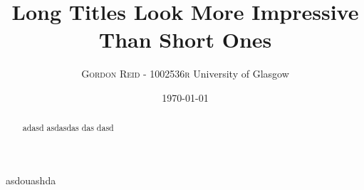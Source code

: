 \documentclass[twoside]{article}
\title{
	\fontsize{24pt}{10pt}\selectfont
	\textbf{Long Titles Look More Impressive Than Short Ones}
	}
\author{%
	\large
	\textsc{Gordon Reid - 1002536r}
	\normalsize	University of Glasgow \\
	\vspace{-5mm}
	}
\date{\today}
\begin{document}
\maketitle
\thispagestyle{fancy}

\begin{abstract}
\noindent adasd asdasdas das dasd
\end{abstract}


\begin{multicols}{2}

asdouashda

\nocite{*}



\end{multicols}
\end{document}

